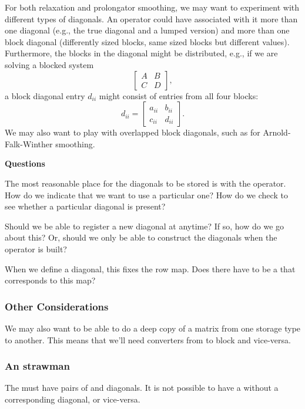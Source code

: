 For both relaxation and prolongator smoothing, we may want to experiment with different types of diagonals.
An operator could have associated with it more than one \point diagonal (e.g., the true \point diagonal and a lumped
version) and more than one block diagonal (differently sized blocks, same sized blocks but different values).
Furthermore, the blocks in the diagonal might be distributed, e.g., if we are solving a blocked system
$$ \left[ \begin{array}{cc} A & B \\ C & D \end{array} \right], $$
a block diagonal entry $d_{ii}$ might consist of \point entries from all four blocks:
$$d_{ii} = \left[ \begin{array}{cc} a_{ii} & b_{ii} \\ c_{ii} & d_{ii} \end{array} \right].$$
%
We may also want to play with overlapped block diagonals, such as for Arnold-Falk-Winther smoothing.

\noindent
{\bf Questions}
\be
\item The most reasonable place for the diagonals to be stored is with the operator.  How do we indicate
that we want to use a particular one?  How do we check to see whether a particular diagonal is present?
%
\item Should we be able to register a new diagonal at anytime?  If so, how do we go about this? Or, should we only
be able to construct the diagonals when the operator is built?
%
\item When we define a diagonal, this fixes the row map.  Does there have to be a \getrow that corresponds to this map?
\ee

\subsubsection{Other Considerations}

We may also want to be able to do a deep copy of a matrix from one storage type to another.
This means that we'll need converters from \point to block and vice-versa.\\

\subsubsection{An \operator strawman}

\be
\item The \operator must have pairs of  and diagonals.  It is not possible to have a \getrow without a
corresponding diagonal, or vice-versa.

